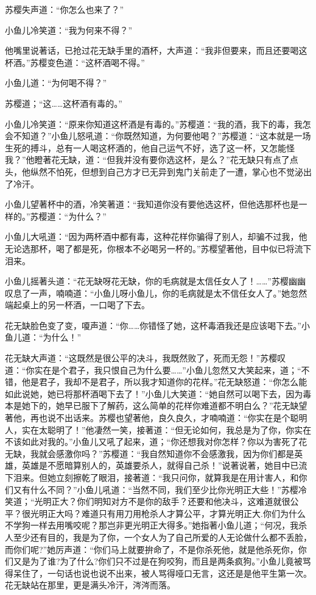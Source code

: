 \documentclass[12pt,oneside]{book}
\begin{document}
苏樱失声道：``你怎么也来了？''

小鱼儿冷笑道：``我为何来不得？''

他嘴里说著话，已抢过花无缺手里的酒杯，大声道：``我非但要来，而且还要喝这杯酒。''苏樱变色道：``这杯酒喝不得。''

小鱼儿道：``为何喝不得？''

苏樱道；``这\ldots\ldots 这杯酒有毒的。''

小鱼儿冷笑道：``原来你知道这杯酒是有毒的。''苏樱道：``我的酒，我下的毒，我怎会不知道？''小鱼儿怒吼道：``你既然知道，为何要他喝？''苏樱道：``这本就是一场生死的搏斗，总有一人喝这杯酒的，他自己运气不好，选了这一杯，又怎能怪我？''他瞪著花无缺，道：``但我并没有要你选这杯，是么？''花无缺只有点了点头，他纵然不怕死，但想到自己方才已无异到鬼门关前走了一遭，掌心也不觉泌出了冷汗。

小鱼儿望著杯中的酒，冷笑著道：``我知道你没有要他选这杯，但他选那杯也是一样的。''苏樱道：``为什么？''

小鱼儿大吼道：``因为两杯酒中都有毒，这种花样你骗得了别人，却骗不过我，他无论选那杯，喝了都是死，你根本不必喝另一杯的。''苏樱望著他，目中似已将流下泪来。

小鱼儿摇著头道：``花无缺呀花无缺，你的毛病就是太信任女人了！\ldots\ldots{}''苏樱幽幽叹息了一声，喃喃道：``小鱼儿呀小鱼儿，你的毛病就是太不信任女人了。''她忽然端起桌上的另一杯酒，一口喝了下去。

花无缺脸色变了变，嗄声道：``你\ldots\ldots 你错怪了她，这杯毒酒我还是应该喝下去。''小鱼儿道：``为什么！''

花无缺大声道：``这既然是很公平的决斗，我既然败了，死而无怨！''苏樱叹道：``你实在是个君子，我只恨自己为什么要\ldots\ldots{}''小鱼儿忽然又大笑起来，道；``不错，他是君子，我却不是君子，所以我才知道你的花样。''花无缺怒道：``你怎么能如此说她，她已将那杯酒喝下去了！''小鱼儿大笑道：``她自然可以喝下去，因为毒本是她下的，她早已服下了解药，这么简单的花样你难道都不明白么？''花无缺望著他，再也说不出话来。苏樱也望著他，良久良久，才喃喃道：``你实在是个聪明人，实在太聪明了！''他凄然一笑，接著道：``但无论如何，我总是为了你，你实在不该如此对我的。''小鱼儿又吼了起来，道；``你还想我对你怎样？你以为害死了花无缺，我就会感激你吗？''苏樱道：``我自然知道你不会感激我，因为你们都是英雄，英雄是不愿暗算别人的，英雄要杀人，就得自己杀！''说著说著，她目中已流下泪来。但她立刻擦乾了眼泪，接著道：``我只问你，就算我是在用计害人，和你们又有什么不同？''小鱼儿吼道：``当然不同，我们至少比你光明正大些！''苏樱冷笑道；``光明正大？你们明知对方不是你的敌手？还要和他决斗，这难道就很公平？很光明正大吗？难道只有用刀用枪杀人才算公平，才算光明正大.你们为什么不学狗一样去用嘴咬呢？那岂非更光明正大得多。''她指著小鱼儿道；``何况，我杀人至少还有目的，我是为了你，一个女人为了自己所爱的人无论做什么都不丢脸，而你们呢?''她厉声道：``你们马上就要拚命了，不是你杀死他，就是他杀死你，你们又是为了谁?为了什么?你们只不过是在狗咬狗，而且是两条疯狗。''小鱼儿竟被骂得呆住了，一句话也说也说不出来，被人骂得哑口无言，这还是是他平生第一次。花无缺站在那里，更是满头冷汗，涔涔而落。
\end{document}

